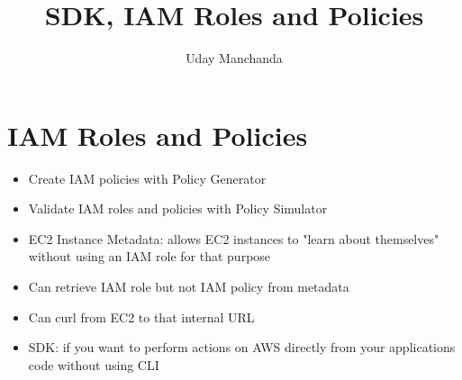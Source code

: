 \documentclass[]{scrartcl}
\title{SDK, IAM Roles and Policies}
\author{Uday Manchanda}
\begin{document}
\maketitle

\section{IAM Roles and Policies}
\begin{itemize}
	\item Create IAM policies with Policy Generator
	\item Validate IAM roles and policies with Policy Simulator
	\item EC2 Instance Metadata: allows EC2 instances to "learn about themselves" without using an IAM role for that purpose
	\item Can retrieve IAM role but not IAM policy from metadata
	\item Can curl from EC2 to that internal URL
	\item SDK: if you want to perform actions on AWS directly from your applications code without using CLI
\end{itemize}
\end{document}
